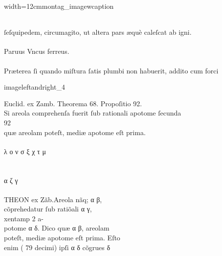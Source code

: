\vspace{2mm}
\begin{sampleImageSmall}{width=12cm}{montag_imagewcaption}
\begin{typeLatin}
 \someText \\
ſeſquipedem, circumagito, ut altera pars æquè caleſcat ab igni.\\
 \\
Paruus Vncus ferreus.\\
 \\
Præterea ſi quando miſtura ſatis plumbi non habuerit, addito cum forci  \\
\someText {}
\end{typeLatin}
\end{sampleImageSmall}

\begin{sampleImage}{imageleftandright_4}
\begin{typeLatin}
Euclid. ex Zamb. T\lwr{}heorema 68. P\lwr{}ropoſitio 92. \\
Si areola comprehenſa fuerit ſub rationali  apotome ſecunda \\
92\\
quæ areolam poteſt, mediæ apotome eſt prima. \\
 \\
λ  ο  ν  σ ξ χ  τ μ \\
 \\
\\
α   ζ  γ     \\
 \\
THEON ex Zãb.\lwr {}Areola nãq; α β, \\
cõpreh\bs\tld{}edatur ſub ratiõali α γ, \\xent{amp} 2 a- \\
potome α δ. Dico  quæ α β, areolam\\
poteſt, mediæ apotome eſt prima. Eſto\\
enim ( 79 decimi) ipſi α δ cõgru\bs\tld{}es δ\\
\someText {}
\end{typeLatin}
\end{sampleImage}

